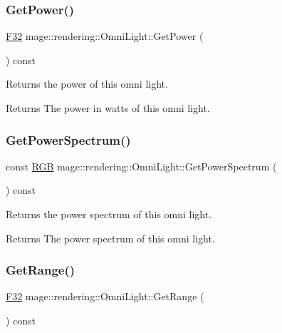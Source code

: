\subsubsection{\texorpdfstring{Get\+Power()}{GetPower()}}
{\footnotesize\ttfamily \hyperlink{namespacemage_aa97e833b45f06d60a0a9c4fc22ae02c0}{F32} mage\+::rendering\+::\+Omni\+Light\+::\+Get\+Power (\begin{DoxyParamCaption}{ }\end{DoxyParamCaption}) const\hspace{0.3cm}{\ttfamily [noexcept]}}

Returns the power of this omni light.

\begin{DoxyReturn}{Returns}
The power in watts of this omni light. 
\end{DoxyReturn}
\hypertarget{classmage_1_1rendering_1_1_omni_light_a82366151b99cc4791d8b361331f75833}{}\label{classmage_1_1rendering_1_1_omni_light_a82366151b99cc4791d8b361331f75833} 
\subsubsection{\texorpdfstring{Get\+Power\+Spectrum()}{GetPowerSpectrum()}}
{\footnotesize\ttfamily const \hyperlink{structmage_1_1_r_g_b}{R\+GB} mage\+::rendering\+::\+Omni\+Light\+::\+Get\+Power\+Spectrum (\begin{DoxyParamCaption}{ }\end{DoxyParamCaption}) const\hspace{0.3cm}{\ttfamily [noexcept]}}

Returns the power spectrum of this omni light.

\begin{DoxyReturn}{Returns}
The power spectrum of this omni light. 
\end{DoxyReturn}
\hypertarget{classmage_1_1rendering_1_1_omni_light_af9bfc4b943b156756cd7c2323d93ebdd}{}\label{classmage_1_1rendering_1_1_omni_light_af9bfc4b943b156756cd7c2323d93ebdd} 
\subsubsection{\texorpdfstring{Get\+Range()}{GetRange()}}
{\footnotesize\ttfamily \hyperlink{namespacemage_aa97e833b45f06d60a0a9c4fc22ae02c0}{F32} mage\+::rendering\+::\+Omni\+Light\+::\+Get\+Range (\begin{DoxyParamCaption}{ }\end{DoxyParamCaption}) const\hspace{0.3cm}{\ttfamily [noexcept]}}

